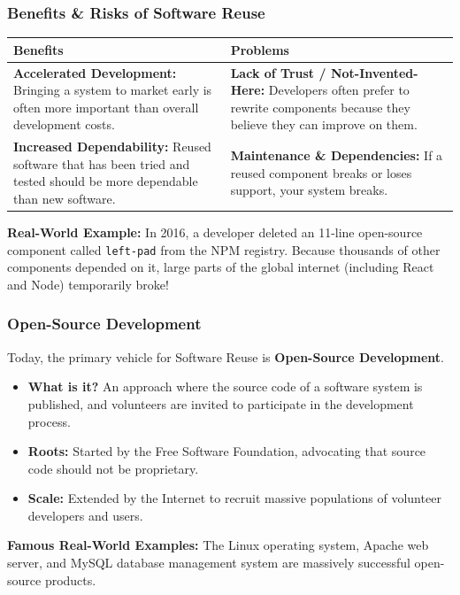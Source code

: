 \documentclass[xcolor=table]{beamer}
\begin{document}
\begin{frame}
    \frametitle{Benefits \& Risks of Software Reuse}
    
    
    \begin{table}
        \centering
        \scriptsize
        \begin{tabular}{|p{}|p{}|}
            \hline
            \rowcolor{cyan!20}
            \textbf{Benefits} & \textbf{Problems} \\
            \hline
            \textbf{Accelerated Development:} Bringing a system to market early is often more important than overall development costs. & \textbf{Lack of Trust / Not-Invented-Here:} Developers often prefer to rewrite components because they believe they can improve on them. \\
            \textbf{Increased Dependability:} Reused software that has been tried and tested should be more dependable than new software. & \textbf{Maintenance \& Dependencies:} If a reused component breaks or loses support, your system breaks. \\
            \hline
        \end{tabular}
    \end{table}
    
    \vspace{0.2cm}
    \footnotesize \textbf{Real-World Example:} In 2016, a developer deleted an 11-line open-source component called \texttt{left-pad} from the NPM registry. Because thousands of other components depended on it, large parts of the global internet (including React and Node) temporarily broke!
\end{frame}

\begin{frame}
    \frametitle{Open-Source Development}
    Today, the primary vehicle for Software Reuse is \textbf{Open-Source Development}.
    
    \begin{itemize}
        \item \textbf{What is it?} An approach where the source code of a software system is published, and volunteers are invited to participate in the development process.
        \item \textbf{Roots:} Started by the Free Software Foundation, advocating that source code should not be proprietary.
        \item \textbf{Scale:} Extended by the Internet to recruit massive populations of volunteer developers and users.
    \end{itemize}
    
    \vspace{0.2cm}
    \textbf{Famous Real-World Examples:} The Linux operating system, Apache web server, and MySQL database management system are massively successful open-source products.
\end{frame}
\end{document}
